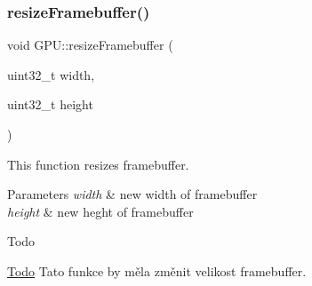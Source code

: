 \subsubsection{\texorpdfstring{resize\+Framebuffer()}{resizeFramebuffer()}}
{\footnotesize\ttfamily void G\+P\+U\+::resize\+Framebuffer (\begin{DoxyParamCaption}\item[{uint32\+\_\+t}]{width,  }\item[{uint32\+\_\+t}]{height }\end{DoxyParamCaption})}



This function resizes framebuffer. 


\begin{DoxyParams}{Parameters}
{\em width} & new width of framebuffer \\
\hline
{\em height} & new heght of framebuffer \\
\hline
\end{DoxyParams}
\begin{DoxyRefDesc}{Todo}
\item[\hyperlink{todo__todo000030}{Todo}]Tato funkce by měla změnit velikost framebuffer. \end{DoxyRefDesc}
